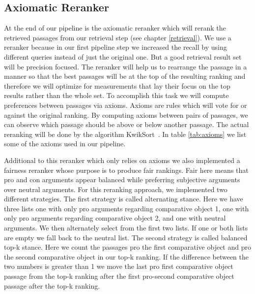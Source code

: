    \subsection{Axiomatic Reranker}
        At the end of our pipeline is the axiomatic reranker which will rerank the retrieved passages from our retrieval step (see chapter \ref{retrieval}). We use a reranker because in our first pipeline step we increased the recall by using different queries instead of just the original one. But a good retrieval result set will be precision focused. The reranker will help us to rearrange the passage in a manner so that the best passages will be at the top of the resulting ranking and therefore we will optimize for measurements that lay their focus on the top results rather than the whole set. To accomplish this task we will compute preferences between passages via axioms. Axioms are rules which will vote for or against the original ranking. By computing axioms between pairs of passages, we can observe which passage should be above or below another passage. The actual reranking will be done by the algorithm KwikSort~\cite{hagen:2016d}. In table \ref{tab:axioms} we list some of the axioms used in our pipeline.\par
        Additional to this reranker which only relies on axioms we also implemented a fairness reranker whose purpose is to produce fair rankings. Fair here means that pro and con arguments appear balanced while preferring subjective arguments over neutral arguments. For this reranking approach, we implemented two different strategies. The first strategy is called alternating stance. Here we have three lists one with only pro arguments regarding comparative object 1, one with only pro arguments regarding comparative object 2, and one with neutral arguments. We then alternately select from the first two lists. If one or both lists are empty we fall back to the neutral list. The second strategy is called balanced top-k stance. Here we count the passages pro the first comparative object and pro the second comparative object in our top-k ranking. If the difference between the two numbers is greater than 1 we move the last pro first comparative object passage from the top-k ranking after the first pro-second comparative object passage after the top-k ranking.     
